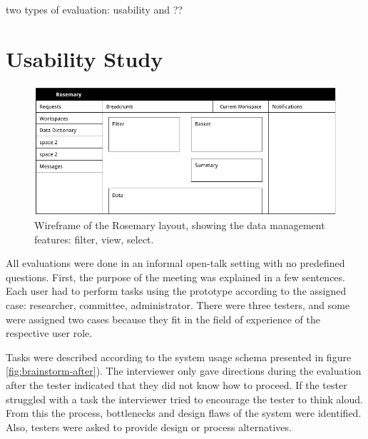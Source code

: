 two types of evaluation: usability and ??


\section{Usability Study}


\begin{figure}[!b]
	\centering
	\includegraphics[width=1.0\linewidth]{images/evaluation-layout}
	\caption{
		Wireframe of the Rosemary layout, showing the data management features: filter, view, select. 
	}
	\label{fig:evaluation-layout}
\end{figure}

All evaluations were done in an informal open-talk setting with no predefined questions.
First, the purpose of the meeting was explained in a few sentences.
Each user had to perform tasks using the prototype according to the assigned case: researcher, committee, administrator.
There were three testers, and some were assigned two cases because they fit in the field of experience of the respective user role.

Tasks were described according to the system usage schema presented in figure \ref{fig:brainstorm-after}).
The interviewer only gave directions during the evaluation after the tester indicated that they did not know how to proceed.
If the tester struggled with a task the interviewer tried to encourage the tester to think aloud.
From this the process, bottlenecks and design flaws of the system were identified.
Also, testers were asked to provide design or process alternatives. 

